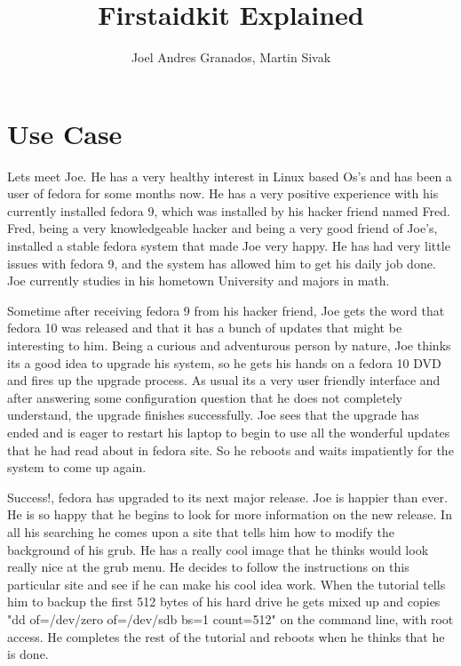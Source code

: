 \documentclass[a4paper,13pt]{article}
\title{Firstaidkit Explained}
\author{Joel Andres Granados, Martin Sivak}
\begin{document}
\maketitle

\section{Use Case}
Lets meet Joe.  He has a very healthy interest in Linux based Os's and has been a user of fedora for some months now.  He has a very positive experience with his currently installed fedora 9, which was installed by his hacker friend named Fred.  Fred, being a very knowledgeable hacker and being a very good friend of Joe's, installed a stable fedora system that made Joe very happy.  He has had very little issues with fedora 9, and the system has allowed him to get his daily job done.  Joe currently studies in his hometown University and majors in math.

Sometime after receiving fedora 9 from his hacker friend, Joe gets the word that fedora 10 was released and that it has a bunch of updates that might be interesting to him.  Being a curious and adventurous person by nature, Joe thinks its a good idea to upgrade his system, so he gets his hands on a fedora 10 DVD and fires up the upgrade process.  As usual its a very user friendly interface and after answering some configuration question that he does not completely understand, the upgrade finishes successfully.  Joe sees that the upgrade has ended and is eager to restart his laptop to begin to use all the wonderful updates that he had read about in fedora site.  So he reboots and waits impatiently for the system to come up again.

Success!, fedora has upgraded to its next major release.  Joe is happier than ever.  He is so happy that he begins to look for more information on the new release.  In all his searching he comes upon a site that tells him how to modify the background of his grub.  He has a really cool image that he thinks would look really nice at the grub menu.  He decides to follow the instructions on this particular site and see if he can make his cool idea work.  When the tutorial tells him to backup the first 512 bytes of his hard drive he gets mixed up and copies "dd of=/dev/zero of=/dev/sdb bs=1 count=512" on the command line, with root access.  He completes the rest of the tutorial and reboots when he thinks that he is done.
\end{document}
